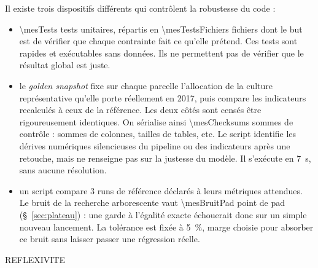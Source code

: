 Il existe trois dispositifs différents qui contrôlent la robustesse du code :
\begin{itemize}
  \item \num{\mesTests} tests unitaires, répartis en \num{\mesTestsFichiers} fichiers dont le but
    est de vérifier que chaque contrainte fait ce qu'elle prétend. Ces tests sont rapides et
    exécutables sans données. Ils ne permettent pas de vérifier que le résultat global est juste.
  \item le \emph{golden snapshot} fixe sur chaque parcelle l'allocation de la culture
    représentative qu'elle porte réellement en \num{2017}, puis compare les indicateurs
    recalculés à ceux de la référence. Les deux côtés sont censés être rigoureusement
    identiques. On sérialise ainsi \num{\mesChecksums} sommes de contrôle : sommes de colonnes,
    tailles de tables, etc. Le script identifie les dérives numériques silencieuses du pipeline
    ou des indicateurs après une retouche, mais ne renseigne pas sur la justesse du modèle. Il
    s'exécute en \SI{7}{\second}, sans aucune résolution.
  \item un script compare \num{3} runs de référence déclarés à leurs métriques attendues. Le
    bruit de la recherche arborescente vaut \num{\mesBruitPad} point de \gls{pad}
    (§~\ref{sec:plateau}) : une garde à l'égalité exacte échouerait donc sur un simple
    nouveau lancement. La tolérance est fixée à \SI{5}{\percent}, marge choisie pour absorber ce
    bruit sans laisser passer une régression réelle.
\end{itemize}

\begin{reflexion}
REFLEXIVITE
\end{reflexion}
